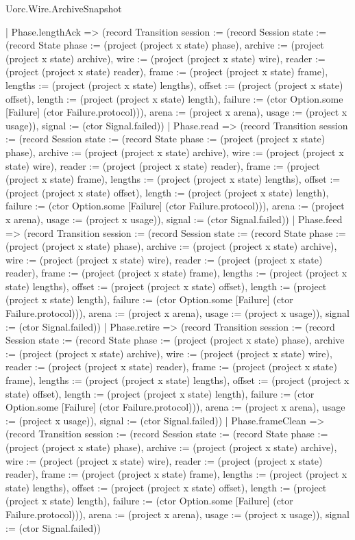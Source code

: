 \begin{lexlean}{Uorc.Wire.ArchiveSnapshot}
\begin{semanticmodule}
{    | Phase.lengthAck => (record Transition {session := (record Session {state := (record State {phase := (project (project x state) phase), archive := (project (project x state) archive), wire := (project (project x state) wire), reader := (project (project x state) reader), frame := (project (project x state) frame), lengths := (project (project x state) lengths), offset := (project (project x state) offset), length := (project (project x state) length), failure := (ctor Option.some [Failure] (ctor Failure.protocol))}), arena := (project x arena), usage := (project x usage)}), signal := (ctor Signal.failed)})
    | Phase.read => (record Transition {session := (record Session {state := (record State {phase := (project (project x state) phase), archive := (project (project x state) archive), wire := (project (project x state) wire), reader := (project (project x state) reader), frame := (project (project x state) frame), lengths := (project (project x state) lengths), offset := (project (project x state) offset), length := (project (project x state) length), failure := (ctor Option.some [Failure] (ctor Failure.protocol))}), arena := (project x arena), usage := (project x usage)}), signal := (ctor Signal.failed)})
    | Phase.feed => (record Transition {session := (record Session {state := (record State {phase := (project (project x state) phase), archive := (project (project x state) archive), wire := (project (project x state) wire), reader := (project (project x state) reader), frame := (project (project x state) frame), lengths := (project (project x state) lengths), offset := (project (project x state) offset), length := (project (project x state) length), failure := (ctor Option.some [Failure] (ctor Failure.protocol))}), arena := (project x arena), usage := (project x usage)}), signal := (ctor Signal.failed)})
    | Phase.retire => (record Transition {session := (record Session {state := (record State {phase := (project (project x state) phase), archive := (project (project x state) archive), wire := (project (project x state) wire), reader := (project (project x state) reader), frame := (project (project x state) frame), lengths := (project (project x state) lengths), offset := (project (project x state) offset), length := (project (project x state) length), failure := (ctor Option.some [Failure] (ctor Failure.protocol))}), arena := (project x arena), usage := (project x usage)}), signal := (ctor Signal.failed)})
    | Phase.frameClean => (record Transition {session := (record Session {state := (record State {phase := (project (project x state) phase), archive := (project (project x state) archive), wire := (project (project x state) wire), reader := (project (project x state) reader), frame := (project (project x state) frame), lengths := (project (project x state) lengths), offset := (project (project x state) offset), length := (project (project x state) length), failure := (ctor Option.some [Failure] (ctor Failure.protocol))}), arena := (project x arena), usage := (project x usage)}), signal := (ctor Signal.failed)})
}
\end{semanticmodule}
\end{lexlean}
